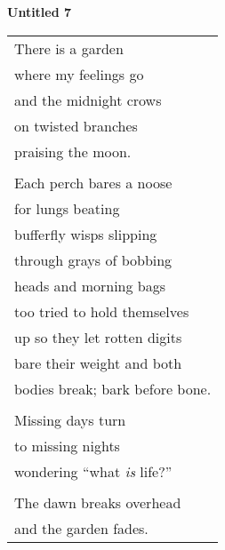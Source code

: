 \documentclass{article}
\begin{document}
\begin{center}
\textbf{Untitled 7} \\
\vspace*{2ex}
\begin{tabular}{l}
There is a garden \\
where my feelings go \\
and the midnight crows \\
on twisted branches \\
praising the moon. \\
\\
Each perch bares a noose \\
for lungs beating \\
bufferfly wisps slipping \\
through grays of bobbing \\
heads and morning bags \\
too tried to hold themselves \\
up so they let rotten digits \\
bare their weight and both \\
bodies break; bark before bone. \\
\\
Missing days turn \\ %
to missing nights \\ %
wondering ``what \textit{is} life?'' \\ %
\\
The dawn breaks overhead \\
and the garden fades. \\
\end{tabular}
\end{center}
\end{document}
